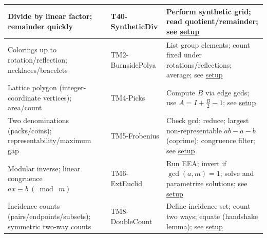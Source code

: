 \documentclass{article}
\begin{document}
\begin{center}
\begin{longtable}{|>{\raggedright\arraybackslash}m{}|>{\raggedright\arraybackslash}p{}|>{\raggedright\arraybackslash}p{}|}
\hline
Divide by linear factor; remainder quickly & T40-SyntheticDiv & Perform synthetic grid; read quotient/remainder; see \hyperlink{technique-setup}{setup} \\
\hline
Colorings up to rotation/reflection; necklaces/bracelets & TM2-BurnsidePolya & List group elements; count fixed under rotations/reflections; average; see \hyperlink{technique-setup}{setup} \\
\hline
Lattice polygon (integer-coordinate vertices); area/count & TM4-Picks & Compute $B$ via edge gcds; use $A=I+\tfrac{B}{2}-1$; see \hyperlink{technique-setup}{setup} \\
\hline
Two denominations (packs/coins); representability/maximum gap & TM5-Frobenius & Check gcd; reduce; largest non-representable $ab-a-b$ (coprime); congruence filter; see \hyperlink{technique-setup}{setup} \\
\hline
Modular inverse; linear congruence $ax\equiv b\ (\bmod\ m)$ & TM6-ExtEuclid & Run EEA; invert if $\gcd(a,m)=1$; solve and parametrize solutions; see \hyperlink{technique-setup}{setup} \\
\hline
Incidence counts (pairs/endpoints/subsets); symmetric two-way counts & TM8-DoubleCount & Define incidence set; count two ways; equate (handshake lemma); see \hyperlink{technique-setup}{setup} \\
\hline
\end{longtable}
\end{center}
\smallskip
\end{document}

